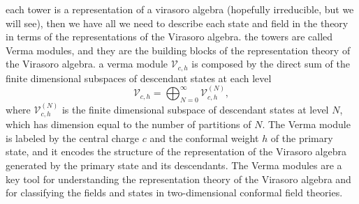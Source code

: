 each tower is a representation of a virasoro algebra (hopefully irreducible, but we will see), then we have all we need to describe each state and field in the theory in terms of the representations of the Virasoro algebra. the towers are called Verma modules, and they are the building blocks of the representation theory of the Virasoro algebra. a verma module \(\mathcal{V}_{c,h}\) is composed by the direct sum of the finite dimensional subspaces of descendant states at each level
\[
    \mathcal{V}_{c,h} = \bigoplus_{N=0}^{\infty} \mathcal{V}_{c,h}^{(N)},
\]
where \(\mathcal{V}_{c,h}^{(N)}\) is the finite dimensional subspace of descendant states at level \(N\), which has dimension equal to the number of partitions of \(N\). The Verma module is labeled by the central charge \(c\) and the conformal weight \(h\) of the primary state, and it encodes the structure of the representation of the Virasoro algebra generated by the primary state and its descendants. The Verma modules are a key tool for understanding the representation theory of the Virasoro algebra and for classifying the fields and states in two-dimensional conformal field theories.